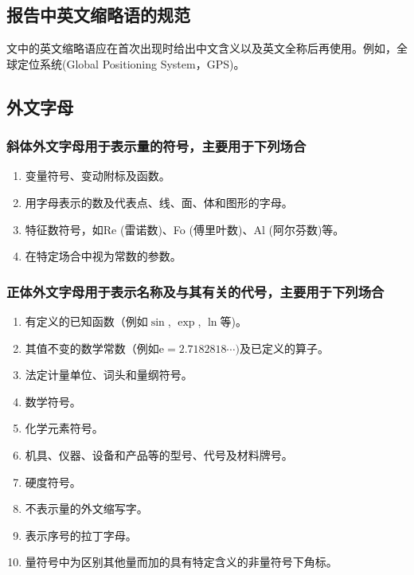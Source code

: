 \documentclass{thuemp}
\begin{document}
\subsection{报告中英文缩略语的规范}
文中的英文缩略语应在首次出现时给出中文含义以及英文全称后再使用。例如，全球定位系统(Global Positioning System，GPS)。


\subsection{外文字母}
\subsubsection{斜体外文字母用于表示量的符号，主要用于下列场合}

\begin{enumerate}
\renewcommand{\labelenumi}{(\theenumi)}
\item 变量符号、变动附标及函数。
\item 用字母表示的数及代表点、线、面、体和图形的字母。
\item 特征数符号，如Re (雷诺数)、Fo (傅里叶数)、Al (阿尔芬数)等。
\item 在特定场合中视为常数的参数。
\end{enumerate} 

\subsubsection{正体外文字母用于表示名称及与其有关的代号，主要用于下列场合}
\begin{enumerate}
\renewcommand{\labelenumi}{(\theenumi)}
\item 有定义的已知函数（例如$\sin$, $\exp$, $\ln$等)。
\item 其值不变的数学常数（例如$\mathrm{e} = 2.718 281 8\cdots)$及已定义的算子。
\item 法定计量单位、词头和量纲符号。
\item 数学符号。
\item 化学元素符号。
\item 机具、仪器、设备和产品等的型号、代号及材料牌号。
\item 硬度符号。
\item 不表示量的外文缩写字。
\item 表示序号的拉丁字母。
\item 量符号中为区别其他量而加的具有特定含义的非量符号下角标。
\end{enumerate} 
\end{document}
